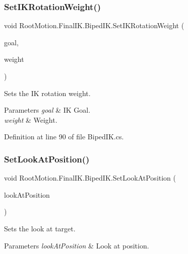\subsubsection{\texorpdfstring{Set\+I\+K\+Rotation\+Weight()}{SetIKRotationWeight()}}
{\footnotesize\ttfamily void Root\+Motion.\+Final\+I\+K.\+Biped\+I\+K.\+Set\+I\+K\+Rotation\+Weight (\begin{DoxyParamCaption}\item[{Avatar\+I\+K\+Goal}]{goal,  }\item[{float}]{weight }\end{DoxyParamCaption})}



Sets the IK rotation weight. 


\begin{DoxyParams}{Parameters}
{\em goal} & IK Goal. \\
\hline
{\em weight} & Weight. \\
\hline
\end{DoxyParams}


Definition at line 90 of file Biped\+I\+K.\+cs.

\mbox{\label{class_root_motion_1_1_final_i_k_1_1_biped_i_k_a4e679efc6cf5a4b4b53fd93c4432ac66}} 
\subsubsection{\texorpdfstring{Set\+Look\+At\+Position()}{SetLookAtPosition()}}
{\footnotesize\ttfamily void Root\+Motion.\+Final\+I\+K.\+Biped\+I\+K.\+Set\+Look\+At\+Position (\begin{DoxyParamCaption}\item[{Vector3}]{look\+At\+Position }\end{DoxyParamCaption})}



Sets the look at target. 


\begin{DoxyParams}{Parameters}
{\em look\+At\+Position} & Look at position. \\
\hline
\end{DoxyParams}


